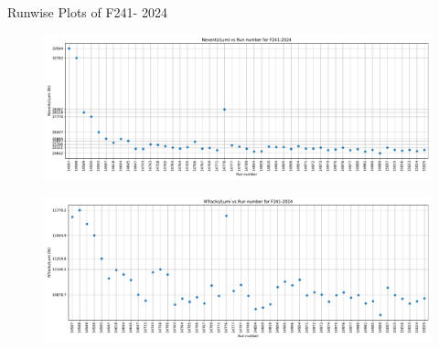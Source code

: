 \begin{frame}{Runwise Plots of F241- 2024}
    \begin{figure}
        \centering
        \includegraphics[width=1.0\textwidth]{plots_runwise/NEventsbyLumi_2024_F241.pdf}
    \end{figure}
    \vspace{-0.35cm}
    \begin{figure}
        \centering
        \includegraphics[width=1.0\textwidth]{plots_runwise/NTracksbyLumi_2024_F241.pdf}
    \end{figure}
\end{frame}

